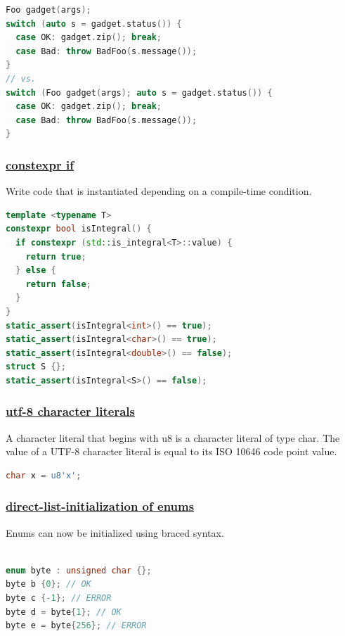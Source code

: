 \begin{lstlisting}[language=C++]
Foo gadget(args);
switch (auto s = gadget.status()) {
  case OK: gadget.zip(); break;
  case Bad: throw BadFoo(s.message());
}
// vs.
switch (Foo gadget(args); auto s = gadget.status()) {
  case OK: gadget.zip(); break;
  case Bad: throw BadFoo(s.message());
}
\end{lstlisting}

\subsubsection{\href{https://github.com/AnthonyCalandra/modern-cpp-features/tree/master\#constexpr-if}
                    {constexpr if}}
Write code that is instantiated depending on a compile-time condition.

\begin{lstlisting}[language=C++]
template <typename T>
constexpr bool isIntegral() {
  if constexpr (std::is_integral<T>::value) {
    return true;
  } else {
    return false;
  }
}
static_assert(isIntegral<int>() == true);
static_assert(isIntegral<char>() == true);
static_assert(isIntegral<double>() == false);
struct S {};
static_assert(isIntegral<S>() == false);
\end{lstlisting}

\subsubsection{\href{https://github.com/AnthonyCalandra/modern-cpp-features/tree/master\#utf-8-character-literals}
                    {utf-8 character literals}}
A character literal that begins with u8 is a character literal of type char. 
The value of a UTF-8 character literal is equal to its ISO 10646 code point value.

\begin{lstlisting}[language=C++]
char x = u8'x';
\end{lstlisting}

\subsubsection{\href{https://github.com/AnthonyCalandra/modern-cpp-features/tree/master\#direct-list-initialization-of-enums}
                    {direct-list-initialization of enums}}
Enums can now be initialized using braced syntax.
\begin{lstlisting}[language=C++]

enum byte : unsigned char {};
byte b {0}; // OK
byte c {-1}; // ERROR
byte d = byte{1}; // OK
byte e = byte{256}; // ERROR
\end{lstlisting}


